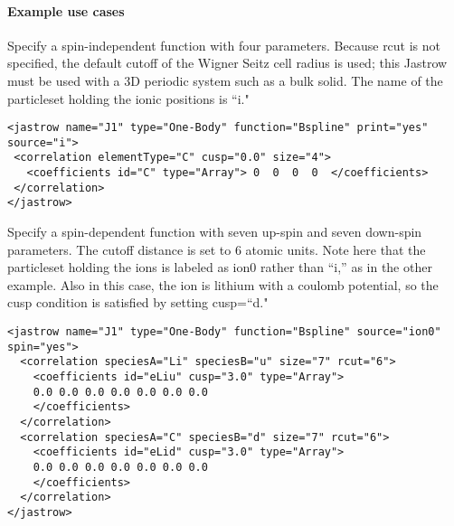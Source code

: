 \paragraph{Example use cases}
\label{sec:1bjsplineexamples}

Specify a spin-independent function with four parameters. Because rcut  is not 
specified, the default cutoff of the Wigner Seitz cell radius is used; this 
Jastrow must be used with a 3D periodic system such as a bulk solid. The name of 
the particleset holding the ionic positions is ``i."
\begin{lstlisting}[style=QMCPXML]
<jastrow name="J1" type="One-Body" function="Bspline" print="yes" source="i">
 <correlation elementType="C" cusp="0.0" size="4">
   <coefficients id="C" type="Array"> 0  0  0  0  </coefficients>
 </correlation>
</jastrow>
\end{lstlisting}

Specify a spin-dependent function with seven up-spin and seven down-spin parameters. 
The cutoff distance is set to 6 atomic units.  Note here that the particleset holding
the ions is labeled as ion0 rather than ``i,'' as in the other example.  Also in this case,
the ion is lithium with a coulomb potential, so the cusp condition is satisfied by 
setting cusp=``d."
\begin{lstlisting}[style=QMCPXML]
<jastrow name="J1" type="One-Body" function="Bspline" source="ion0" spin="yes">
  <correlation speciesA="Li" speciesB="u" size="7" rcut="6">
    <coefficients id="eLiu" cusp="3.0" type="Array"> 
    0.0 0.0 0.0 0.0 0.0 0.0 0.0
    </coefficients>
  </correlation>
  <correlation speciesA="C" speciesB="d" size="7" rcut="6">
    <coefficients id="eLid" cusp="3.0" type="Array"> 
    0.0 0.0 0.0 0.0 0.0 0.0 0.0
    </coefficients>
  </correlation>
</jastrow>
\end{lstlisting}

